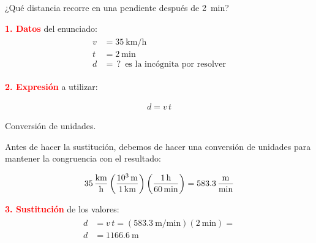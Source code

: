 \documentclass[14pt]{extarticle}
\newcommand{\textocolor}[2]{\textbf{\textcolor{#1}{#2}}}
\begin{document}
¿Qué distancia recorre en una pendiente después de \SI{2}{\minute}?

\textocolor{red}{1. Datos} del enunciado:
\begin{eqnarray*}
\begin{aligned}
v &= \SI{35}{\kilo\meter\per\hour} \\[0.5em] 
t &= \SI{2}{\minute} \\[0.5em] 
d &= \, ? \, \text{ es la incógnita por resolver}
\end{aligned}
\end{eqnarray*}

\textocolor{red}{2. Expresión} a utilizar:

\begin{minipage}{0.4\linewidth}
\begin{figure}[H]
\centering
{}
\end{figure}
\end{minipage}
\hspace{0.5cm}
\begin{minipage}{0.4\linewidth}
\begin{align*}
d = v \, t
\end{align*}
\end{minipage}

\vspace{0.5cm}
Conversión de unidades.

Antes de hacer la sustitución, debemos de hacer una conversión de unidades para mantener la congruencia con el resultado:

\begin{eqnarray*}
\begin{aligned}
\SI[per-mode=fraction]{35}{\kilo\meter\per\hour} \left( \dfrac{\SI{d3}{\meter}}{\SI{1}{\kilo\meter}} \right) \left( \dfrac{\SI{1}{\hour}}{\SI{60}{\minute}} \right) = \SI[per-mode=fraction]{583.3}{\meter\per\minute}
\end{aligned}
\end{eqnarray*}

\textocolor{red}{3. Sustitución} de los valores:
\begin{eqnarray*}
\begin{aligned}
d &= v \, t  = \left( \SI[per-mode=fraction]{583.3}{\meter\per\minute} \right) \left( \SI{2}{\minute} \right) = \\[0.5em] 
d &= \SI{1166.6}{\meter}
\end{aligned}
\end{eqnarray*}
\end{document}
